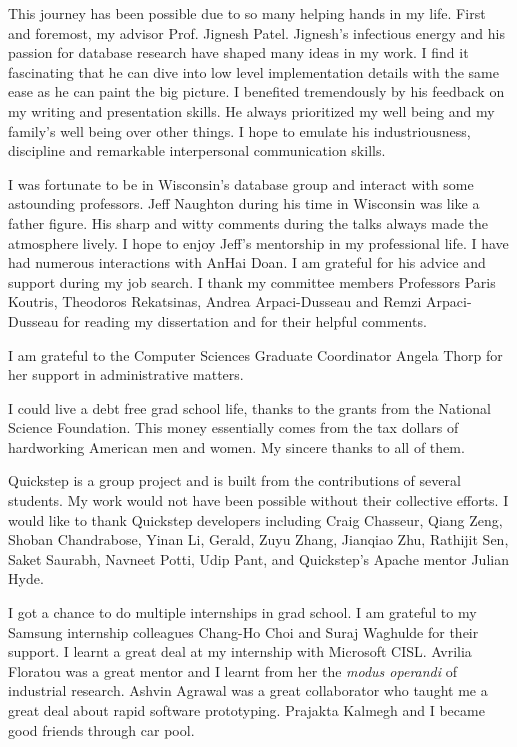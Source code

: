 This journey has been possible due to so many helping hands in my life. 
First and foremost, my advisor Prof. Jignesh Patel. 
Jignesh's infectious energy and his passion for database research have shaped many ideas in my work.
I find it fascinating that he can dive into low level implementation details with the same ease as he can paint the big picture.
I benefited tremendously by his feedback on my writing and presentation skills. 
He always prioritized my well being and my family's well being over other things. 
I hope to emulate his industriousness, discipline and remarkable interpersonal communication skills. 

I was fortunate to be in Wisconsin's database group and interact with some astounding professors. 
Jeff Naughton during his time in Wisconsin was like a father figure. 
His sharp and witty comments during the talks always made the atmosphere lively. 
I hope to enjoy Jeff's mentorship in my professional life. 
I have had numerous interactions with AnHai Doan.
I am grateful for his advice and support during my job search.
I thank my committee members Professors Paris Koutris, Theodoros Rekatsinas, Andrea Arpaci-Dusseau and Remzi Arpaci-Dusseau for reading my dissertation and for their helpful comments. 

I am grateful to the Computer Sciences Graduate Coordinator Angela Thorp for her support in administrative matters. 

I could live a debt free grad school life, thanks to the grants from the National Science Foundation.
This money essentially comes from the tax dollars of hardworking American men and women.
My sincere thanks to all of them.

Quickstep is a group project and is built from the contributions of several students.
My work would not have been possible without their collective efforts. 
I would like to thank Quickstep developers including Craig Chasseur, Qiang Zeng, Shoban Chandrabose, Yinan Li, Gerald, Zuyu Zhang, Jianqiao Zhu, Rathijit Sen, Saket Saurabh, Navneet Potti, Udip Pant, and Quickstep's Apache mentor Julian Hyde.  

I got a chance to do multiple internships in grad school. 
I am grateful to my Samsung internship colleagues Chang-Ho Choi and Suraj Waghulde for their support. 
I learnt a great deal at my internship with Microsoft CISL.
Avrilia Floratou was a great mentor and I learnt from her the \textit{modus operandi} of industrial research.
Ashvin Agrawal was a great collaborator who taught me a great deal about rapid software prototyping. 
Prajakta Kalmegh and I became good friends through car pool. 

